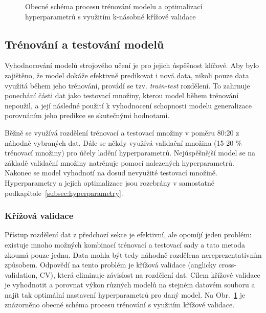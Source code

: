 \begin{figure}[!htb]
\begin{center}
        \caption{Obecné schéma procesu trénování modelu a optimalizací
            hyperparametrů s využitím k-násobné křížové
            validace~\cite{crossvalidation}}
        \label{fig:cross-validation}
    \end{center}
\end{figure}


\subsection{Trénování a testování modelů}
Vyhodnocování modelů strojového učení je pro jejich úspěšnost klíčové. Aby bylo
zajištěno, že model dokáže efektivně predikovat i nová data, nikoli pouze data
využitá během jeho trénování, provádí se tzv. \emph{train-test} rozdělení. To
zahrnuje ponechání části dat jako testovací množiny, kterou model během
trénování nepoužil, a její následné použití k vyhodnocení schopnosti modelu
generalizace porovnáním jeho predikce se skutečnými hodnotami. 

Běžně se využívá rozdělení trénovací a testovací množiny v poměru 80:20 z
náhodně vybraných dat. Dále se někdy využívá validační množina (15-20 \%
trénovací množiny) pro účely ladění hyperparametrů. Nejúspěšnější model se na
základě validační množiny natrénuje pomocí nalezených hyperparametrů. Nakonec se
model vyhodnotí na dosud nevyužité testovací množině. Hyperparametry a jejich
optimalizace jsou rozebrány v samostatné
podkapitole~\ref{subsec:hyperparametry}.

\subsubsection{Křížová validace} %
Přístup rozdělení dat z předchozí sekce je efektivní, ale opomíjí jeden problém:
existuje mnoho možných kombinací trénovací a testovací sady a tato metoda zkoumá
pouze jednu. Data mohla být tedy náhodně rozdělena nereprezentativním způsobem.
Odpovědí na tento problém je křížová validace (anglicky cross-validation,
\gls{CV}), která eliminuje závislost na rozdělení dat. Cílem křížové validace je
vyhodnotit a porovnat výkon různých modelů na stejném datovém souboru a najít
tak optimální nastavení hyperparametrů pro daný model. Na
Obr.~\ref{fig:cross-validation} je znázorněno obecné schéma procesu trénování s
využitím křížové validace.

